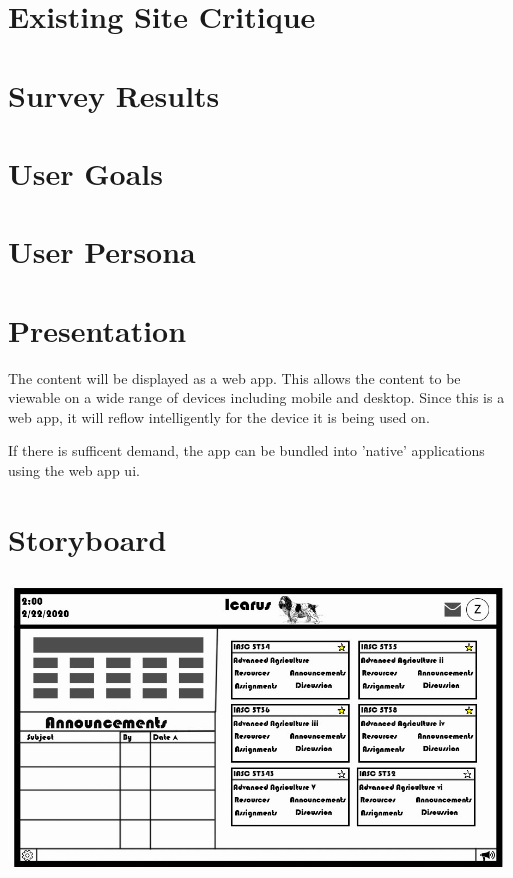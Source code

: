 \documentclass[12pt]{article}
\begin{document}


    \section{Existing Site Critique}\label{sec:existing-site-critique}



    \section{Survey Results}\label{sec:survey-results}



    \section{User Goals}\label{sec:user-goals}



    \section{User Persona}\label{sec:user-persona}



    \section{Presentation}\label{sec:presentation}

    The content will be displayed as a web app.
    This allows the content to be viewable on a wide range of devices including mobile and desktop.
    Since this is a web app, it will reflow intelligently for the device it is being used on.

    If there is sufficent demand, the app can be bundled into 'native' applications using the web app ui.


    \section{Storyboard}\label{sec:storyboard}

    \includegraphics[width=\textwidth]{StoryBoard.jpg}
\end{document}
